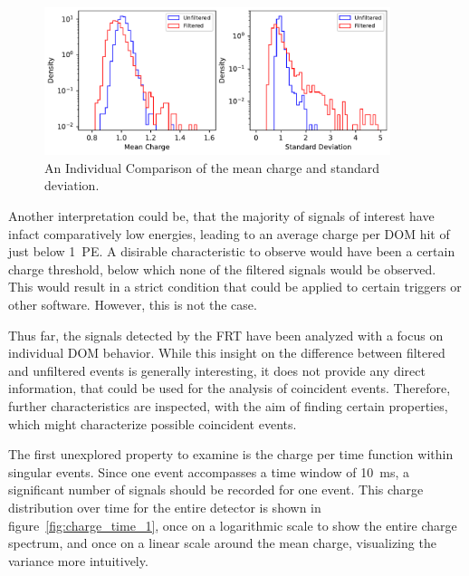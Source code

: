 \begin{figure}[H]
    \centering
    \includegraphics[width=0.9\textwidth]{Plots/qp_mean_std_comparison_histograms.pdf}
    \caption{An Individual Comparison of the mean charge and standard deviation.}
    \label{fig:mean_std_hist}
\end{figure}

Another interpretation could be, that the majority of signals of interest have infact comparatively low energies, leading to an average charge per DOM hit of 
just below \num{1}~\unit{PE}. A disirable characteristic to observe would have been a certain charge threshold, below which none of the filtered signals 
would be observed. This would result in a strict condition that could be applied to certain triggers or other software. However, this is not the case. 



Thus far, the signals detected by the FRT have been analyzed with a focus on individual DOM behavior. While this insight on the difference between filtered and 
unfiltered events is generally interesting, it does not provide any direct information, that could be used for the analysis of coincident events. Therefore, further 
characteristics are inspected, with the aim of finding certain properties, which might characterize possible coincident events.

The first unexplored property to examine is the charge per 
time function within singular events. Since one event accompasses a time window of \SI{10}{\milli\second}, a significant number of signals should be 
recorded for one event. This charge distribution over time for the entire detector is shown in figure~\ref{fig:charge_time_1}, once on a logarithmic scale to show 
the entire charge spectrum, and once on a linear scale around the mean charge, visualizing the variance more intuitively. 

